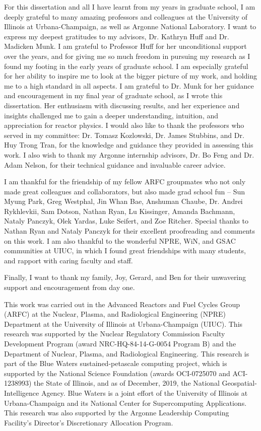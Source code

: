For this dissertation and all I have learnt from my years in graduate school, 
I am deeply grateful to many amazing professors and colleagues at the University of 
Illinois at Urbana-Champaign, as well as Argonne National Laboratory. 
I want to express my deepest gratitudes to my advisors, Dr. Kathryn Huff and Dr. 
Madicken Munk. 
I am grateful to Professor Huff for her unconditional support over the years, and for 
giving me so much freedom in pursuing my research as I found my footing in the early 
years of graduate school. 
I am especially grateful for her ability to inspire me to look at the bigger picture of 
my work, and holding me to a high standard in all aspects.
I am grateful to Dr. Munk for her guidance and encouragement in my final year 
of graduate school, as I wrote this dissertation. 
Her enthusiasm with discussing results, and her experience and insights challenged me to 
gain a deeper understanding, intuition, and appreciation for reactor physics.  
I would also like to thank the professors who served in my committee: Dr. Tomasz 
Kozlowski, Dr. James Stubbins, and Dr. Huy Trong Tran, for the knowledge and guidance 
they provided in assessing this work. 
I also wish to thank my Argonne internship advisors, Dr. Bo Feng and Dr. Adam Nelson, 
for their technical guidance and invaluable career advice. 

I am thankful for the friendship of my fellow ARFC 
groupmates who not only made great colleagues and collaborators, but also made 
grad school fun -- Sun Myung Park, Greg Westphal, Jin Whan Bae, Anshuman Chaube, 
Dr. Andrei Rykhlevkii, Sam Dotson, Nathan Ryan, Lu Kissinger, Amanda Bachmann, 
Nataly Panczyk, Olek Yardas, Luke Seifert, and Zoe Ritcher. 
Special thanks to Nathan Ryan and Nataly Panczyk for their excellent proofreading 
and comments on this work. 
I am also thankful to the wonderful NPRE, WiN, and GSAC communities at UIUC, in which 
I found great friendships with many students, and rapport with caring faculty and staff. 

Finally, I want to thank my family, Joy, Gerard, and Ben for their unwavering support 
and encouragement from day one. 

This work was carried out in the Advanced Reactors and Fuel Cycles Group (ARFC) at the 
Nuclear, Plasma, and Radiological Engineering (NPRE) Department at the University of 
Illinois at Urbana-Champaign (UIUC). 
This research was supported by the Nuclear Regulatory Commission Faculty Development 
Program (award NRC-HQ-84-14-G-0054 Program B) and the Department of Nuclear, Plasma, 
and Radiological Engineering.
This research is part of the Blue Waters sustained-petascale computing project, 
which is supported by the National Science Foundation (awards OCI-0725070 and 
ACI-1238993) the State of Illinois, and as of December, 2019, the National 
Geospatial-Intelligence Agency. 
Blue Waters is a joint effort of the University of Illinois at Urbana-Champaign and 
its National Center for Supercomputing Applications.
This research was also supported by the Argonne Leadership Computing Facility's 
Director's Discretionary Allocation Program. 